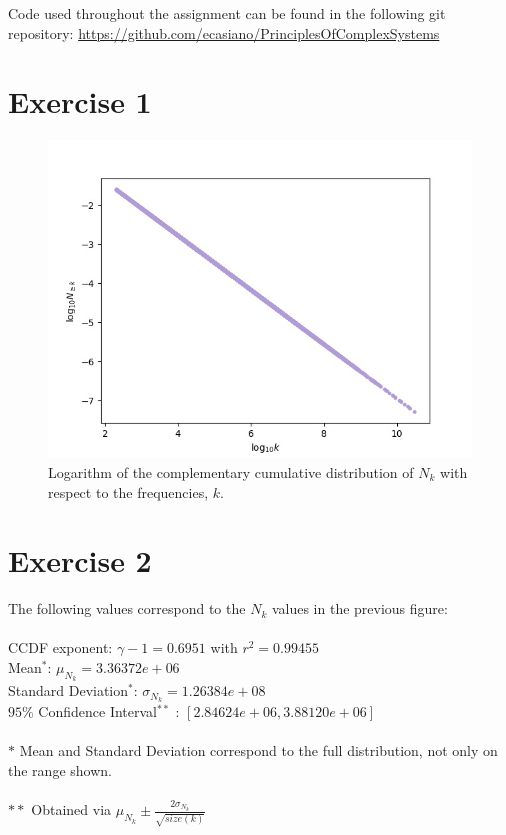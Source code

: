 \documentclass{article}
\begin{document}
Code used throughout the assignment can be found in the following git repository: \url{https://github.com/ecasiano/PrinciplesOfComplexSystems} \\

\section{Exercise 1}

\begin{figure}[h!]
\includegraphics[width=\linewidth]{Q01/wordFrequencyCCDFLog.jpg}
\caption{Logarithm of the complementary cumulative distribution of $N_k$ with respect to the frequencies, $k$. }
\label{fig:ccdf}
\end{figure}

\section{Exercise 2}

The following values correspond to the $N_k$ values in the previous figure: \\
\\
CCDF exponent: $\gamma-1 = 0.6951$ with $r^2 = 0.99455$\\
Mean$^*$: $\mu_{N_k} = 3.36372e+06$\\
Standard Deviation$^*$: $\sigma_{N_k} =1.26384e+08$\\
$95\%$ Confidence Interval$^{**}$ : $[2.84624e+06,3.88120e+06]$\\
\\
$*$ Mean and Standard Deviation correspond to the full distribution, not only on the range shown.\\
\\
$**$ Obtained via $\mu_{N_k} \pm \frac{2\sigma_{N_k}}{\sqrt{size(k)}}$ 
\end{document}

